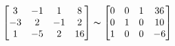 $\begin{bmatrix}
3 &-1 &1 & 8 \\
-3 &2 &-1 &2 \\
1 &-5 &2 & 16
\end{bmatrix}\thicksim
\begin{bmatrix}
0 &0 &1 &36\\
0 &1 &0 &10\\
1 &0 &0 &-6
\end{bmatrix}$